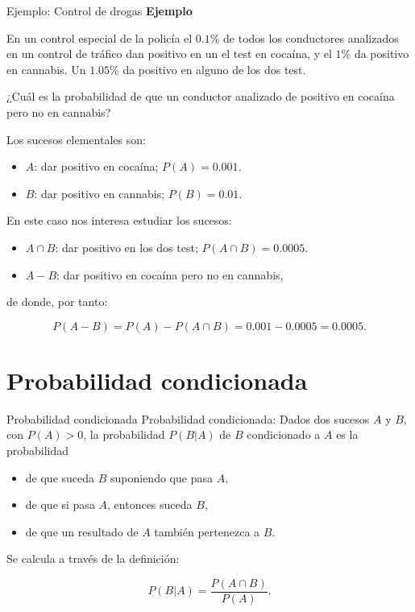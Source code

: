 \documentclass[
  ignorenonframetext,
]{beamer}
\providecommand{\tightlist}{%
  \setlength{\itemsep}{0pt}\setlength{\parskip}{0pt}}
\begin{document}
\begin{frame}{Ejemplo: Control de drogas}
\protect\hypertarget{ejemplo-control-de-drogas}{}
\textbf{Ejemplo}

En un control especial de la policía el \(0.1\%\) de todos los
conductores analizados en un control de tráfico dan positivo en un el
test en cocaína, y el \(1\%\) da positivo en cannabis. Un \(1.05\%\) da
positivo en alguno de los dos test.

¿Cuál es la probabilidad de que un conductor analizado de positivo en
cocaína pero no en cannabis?

Los sucesos elementales son:

\begin{itemize}
\tightlist
\item
  \(A\): dar positivo en cocaína; \(P(A)=0.001.\)
\item
  \(B\): dar positivo en cannabis; \(P(B)=0.01.\)
\end{itemize}

En este caso nos interesa estudiar los sucesos:

\begin{itemize}
\tightlist
\item
  \(A\cap B\): dar positivo en los dos test; \(P(A\cap B)=0.0005.\)
\item
  \(A-B\): dar positivo en cocaína pero no en cannabis,
\end{itemize}

de donde, por tanto:

\[P(A-B) =P(A)-P(A\cap B) =0.001-0.0005=0.0005.\]
\end{frame}

\hypertarget{probabilidad-condicionada}{%
\section{Probabilidad condicionada}\label{probabilidad-condicionada}}

\begin{frame}{Probabilidad condicionada}
\protect\hypertarget{probabilidad-condicionada-1}{}
Probabilidad condicionada: Dados dos sucesos \(A\) y \(B\), con
\(P(A)>0\), la probabilidad \(P(B|A)\) de \(B\) condicionado a \(A\) es
la probabilidad

\begin{itemize}
\tightlist
\item
  de que suceda \(B\) suponiendo que pasa \(A\),
\item
  de que si pasa \(A\), entonces suceda \(B\),
\item
  de que un resultado de \(A\) también pertenezca a \(B\).
\end{itemize}

Se calcula a través de la definición:

\[
P(B|A)=\frac{P(A\cap B)}{P(A)}.
\]
\end{frame}
\end{document}
